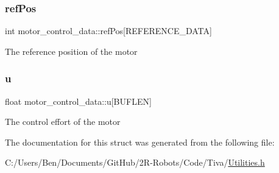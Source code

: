 \subsubsection{\texorpdfstring{ref\+Pos}{refPos}}
{\footnotesize\ttfamily int motor\+\_\+control\+\_\+data\+::ref\+Pos\mbox{[}R\+E\+F\+E\+R\+E\+N\+C\+E\+\_\+\+D\+A\+TA\mbox{]}}

The reference position of the motor \mbox{\label{structmotor__control__data_aa1f8bd9efa226554a0cd30462bf215e9}} 
\subsubsection{\texorpdfstring{u}{u}}
{\footnotesize\ttfamily float motor\+\_\+control\+\_\+data\+::u\mbox{[}B\+U\+F\+L\+EN\mbox{]}}

The control effort of the motor 

The documentation for this struct was generated from the following file\+:\begin{DoxyCompactItemize}
\item 
C\+:/\+Users/\+Ben/\+Documents/\+Git\+Hub/2\+R-\/\+Robots/\+Code/\+Tiva/\mbox{\hyperlink{_utilities_8h}{Utilities.\+h}}\end{DoxyCompactItemize}

